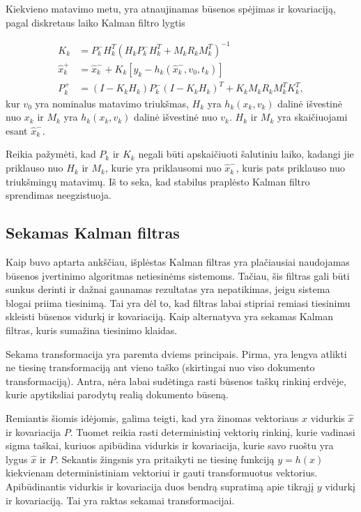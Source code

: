     Kiekvieno matavimo metu, yra atnaujinamas būsenos spėjimas ir kovariaciją, pagal diskretaus laiko Kalman filtro lygtis

    \begin{equation}
        \begin{aligned}
            K_k &= P^-_k H_k^T (H_kP_k^-H_k^T + M_kR_kM_k^T)^{-1} \\
            \hat{x}_k^+ &= \hat{x}_k^- + K_k[ y_k - h_k(\hat{x}_k^-, v_0, t_k) ] \\
            P_k^+ &= (I - K_kH_k)P_k^-(I - K_kH_k)^T + K_kM_kR_kM_k^TK_k^T,
        \end{aligned}
    \end{equation}
    kur $v_0$ yra nominalus matavimo triukšmas, $H_k$ yra $h_k(x_k, v_k)$ dalinė išvestinė nuo $x_k$ ir $M_k$ yra $h_k(x_k, v_k)$ dalinė išvestinė nuo $v_k$.
    $H_k$ ir $M_k$ yra skaičiuojami esant $\hat{x}_k^-$.

    Reikia pažymėti, kad $P_k$ ir $K_k$ negali būti apskaičiuoti šalutiniu laiko, kadangi jie priklauso nuo $H_k$ ir $M_k$, kurie yra priklausomi nuo $\hat{x}_k^-$, kuris pats priklauso nuo triukšmingų matavimų.
    Iš to seka, kad stabilus praplėsto Kalman filtro sprendimas neegzistuoja.

\subsection{Sekamas Kalman filtras}


Kaip buvo aptarta ankščiau, išplėstas Kalman filtras yra plačiausiai naudojamas būsenos įvertinimo algoritmas netiesinėms sistemoms.
Tačiau, šis filtras gali būti sunkus derinti ir dažnai gaunamas rezultatas yra nepatikimas, jeigu sistema blogai priima tiesinimą.
Tai yra dėl to, kad filtras labai stipriai remiasi tiesinimu skleisti būsenos vidurkį ir kovariaciją.
Kaip alternatyva yra sekamas Kalman filtras, kuris sumažina tiesinimo klaidas.

Sekama transformacija yra paremta dviems principais.
Pirma, yra lengva atlikti ne tiesinę transformaciją ant vieno taško (skirtingai nuo viso dokumento transformaciją).
Antra, nėra labai sudėtinga rasti būsenos taškų rinkinį erdvėje, kurie apytiksliai parodytų realią dokumento būseną.

Remiantis šiomis idėjomis, galima teigti, kad yra žinomas vektoriaus $x$ vidurkis $\hat{x}$ ir kovariacija $P$.
Tuomet reikia rasti deterministinį vektorių rinkinį, kurie vadinasi sigma taškai, kuriuos apibūdina vidurkis ir kovariacija, kurie savo ruoštu yra lygus $\hat{x}$ ir $P$.
Sekantis žingsnis yra pritaikyti ne tiesinę funkciją $y = h(x)$ kiekvienam deterministiniam vektoriui ir gauti transformuotus vektorius.
Apibūdinantis vidurkis ir kovariacija duos bendrą supratimą apie tikrąjį $y$ vidurkį ir kovariaciją.
Tai yra raktas sekamai transformacijai.


